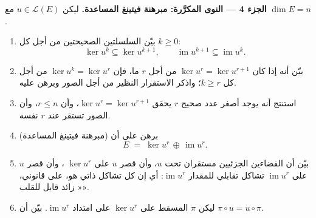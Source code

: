 \begin{problem}
\medskip
\noindent\textbf{الجزء 4 --- النوى المكرَّرة: مبرهنة فيتينغ المساعدة.}
ليكن $u \in \mathcal{L}(E)$ مع $\dim E = n$.
\begin{enumerate}[resume]
  \item بيّن السلسلتين الصحيحتين من أجل كل $k \geq 0$:
        \[
        \ker u^k \subseteq \ker u^{k+1},
        \qquad
        \operatorname{im} u^{k+1} \subseteq \operatorname{im}
        u^k .
        \]
  \item بيّن أنه إذا كان $\ker u^{r} = \ker u^{r+1}$ من أجل $r$ ما،
        فإن $\ker u^{k} = \ker u^{r}$ من أجل كل $k \geq r$؛ واذكر
        الاستقرار النظير من أجل الصور وبرهن عليه.
  \item استنتج أنه يوجد أصغر عدد صحيح $r$ يحقق $\ker
        u^{r} = \ker u^{r+1}$، وأن $r \leq n$، وأن الصور
        تستقر عند $r$ نفسه.
  \item (مبرهنة فيتينغ المساعدة) برهن على أن
        \[
        E \;=\; \ker u^{r} \,\oplus\, \operatorname{im} u^{r} .
        \]
  \item بيّن أن الفضاءين الجزئيين مستقران تحت $u$، وأن
        قصر $u$ على $\ker u^{r}$ ، وأن
        قصر $u$ على $\operatorname{im} u^{r}$ تشاكل
        تقابلي للمقدار $\operatorname{im} u^{r}$: أي إن كل
        تشاكل ذاتي هو، على  قانوني، «
        زائد قابل للقلب».
  \item ليكن $\pi$ المسقط على $\ker u^{r}$ على امتداد
        $\operatorname{im} u^{r}$. بيّن أن $\pi \circ u = u
        \circ \pi$.
\end{enumerate}


\end{problem}
